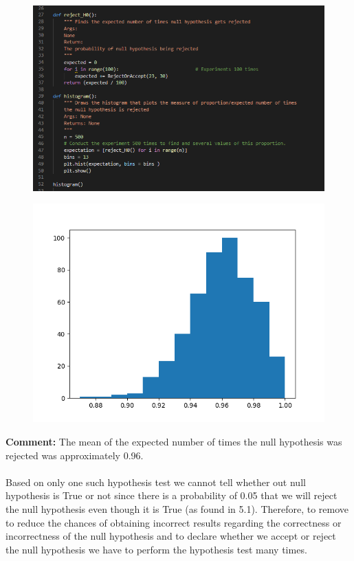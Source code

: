 \documentclass[answers]{exam}
\begin{document}
\begin{framed}
\begin{figure}[H] %
    \centering
    \includegraphics[width= 1 \textwidth]{Q5.2_code_4.PNG}
\end{figure}

\begin{figure}[H] %
    \centering
    \includegraphics[width= 0.5 \textwidth]{Q5.2_histogram_2.png}
\end{figure}

\textbf{Comment:}
The mean of the expected number of times the null hypothesis was rejected was approximately 0.96.\\\\ Based on only one such hypothesis test we cannot tell whether out null hypothesis is True or not since there is a probability of 0.05 that we will reject the null hypothesis even though it is True (as found in 5.1). Therefore, to remove to reduce the chances of obtaining incorrect results regarding the correctness or incorrectness of the null hypothesis and to declare whether we accept or reject the null hypothesis we have to perform the hypothesis test many times. 
\end{framed}

\end{document}
